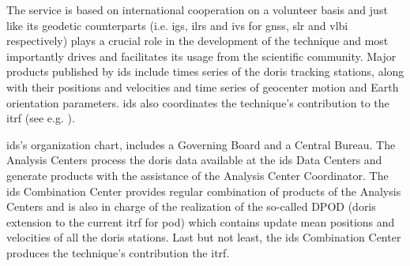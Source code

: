 The service is based on international cooperation on a volunteer basis and just like 
its geodetic counterparts (i.e. \gls{igs}, \gls{ilrs} and \gls{ivs} for \gls{gnss}, 
\gls{slr} and \gls{vlbi} respectively) plays a crucial role in the development of 
the technique and most importantly drives and facilitates its usage from the scientific 
community. Major products published by \gls{ids} include times series of the \gls{doris} 
tracking stations, along with their positions and velocities  and time series of 
geocenter motion and Earth orientation parameters. \gls{ids} also coordinates the 
technique's contribution to the \gls{itrf} (see e.g. \cite{Moreaux2022}).

\gls{ids}'s organization chart, includes a Governing Board and a Central Bureau.
The Analysis Centers process the \gls{doris} data available at the \gls{ids} Data 
Centers and generate products with the assistance of the Analysis Center Coordinator.
The \gls{ids} Combination Center provides regular combination of products of 
the Analysis Centers and is also in charge of the realization of the so-called 
DPOD (\gls{doris} extension to the current \gls{itrf} for \gls{pod}) 
which contains update mean positions and velocities of all the \gls{doris} stations. 
Last but not least, the \gls{ids} Combination Center produces the technique's 
contribution the \gls{itrf}.

\iffalse
\fi
